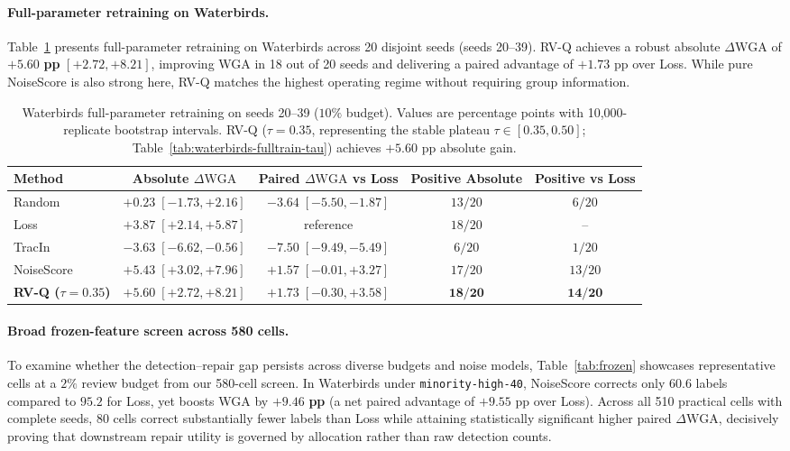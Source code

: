 \documentclass{article}
\newcommand{\dwga}{\ensuremath{\Delta\mathrm{WGA}}}
\begin{document}
\paragraph{Full-parameter retraining on Waterbirds.}
Table~\ref{tab:e2e-waterbirds-main} presents full-parameter retraining on Waterbirds across 20 disjoint seeds (seeds 20--39). RV-Q achieves a robust absolute $\dwga$ of $\mathbf{+5.60}$ \textbf{pp} $[+2.72, +8.21]$, improving WGA in 18 out of 20 seeds and delivering a paired advantage of $+1.73$ pp over Loss. While pure NoiseScore is also strong here, RV-Q matches the highest operating regime without requiring group information.

\begin{table}[t]
\caption{Waterbirds full-parameter retraining on seeds 20--39 ($10\%$ budget). Values are percentage points with 10,000-replicate bootstrap intervals. RV-Q ($\tau=0.35$, representing the stable plateau $\tau \in [0.35, 0.50]$; Table~\ref{tab:waterbirds-fulltrain-tau}) achieves $+5.60$ pp absolute gain.}
\label{tab:e2e-waterbirds-main}
\centering
\scriptsize
\setlength{\tabcolsep}{3.5pt}
\begin{tabular}{lcccc}
\toprule
Method & Absolute $\dwga$ & Paired $\dwga$ vs Loss & Positive Absolute & Positive vs Loss \\
\midrule
Random & $+0.23\;[-1.73,+2.16]$ & $-3.64\;[-5.50,-1.87]$ & $13/20$ & $6/20$ \\
Loss & $+3.87\;[+2.14,+5.87]$ & reference & $18/20$ & -- \\
TracIn & $-3.63\;[-6.62,-0.56]$ & $-7.50\;[-9.49,-5.49]$ & $6/20$ & $1/20$ \\
NoiseScore & $+5.43\;[+3.02,+7.96]$ & $+1.57\;[-0.01,+3.27]$ & $17/20$ & $13/20$ \\
\textbf{RV-Q ($\tau=0.35$)} & $\mathbf{+5.60\;[+2.72,+8.21]}$ & $\mathbf{+1.73\;[-0.30,+3.58]}$ & $\mathbf{18/20}$ & $\mathbf{14/20}$ \\
\bottomrule
\end{tabular}
\end{table}

\paragraph{Broad frozen-feature screen across 580 cells.}
To examine whether the detection--repair gap persists across diverse budgets and noise models, Table~\ref{tab:frozen} showcases representative cells at a $2\%$ review budget from our 580-cell screen. In Waterbirds under \texttt{minority-high-40}, NoiseScore corrects only $60.6$ labels compared to $95.2$ for Loss, yet boosts WGA by $\mathbf{+9.46}$ \textbf{pp} (a net paired advantage of $+9.55$ pp over Loss). Across all 510 practical cells with complete seeds, 80 cells correct substantially fewer labels than Loss while attaining statistically significant higher paired $\dwga$, decisively proving that downstream repair utility is governed by allocation rather than raw detection counts.
\end{document}
